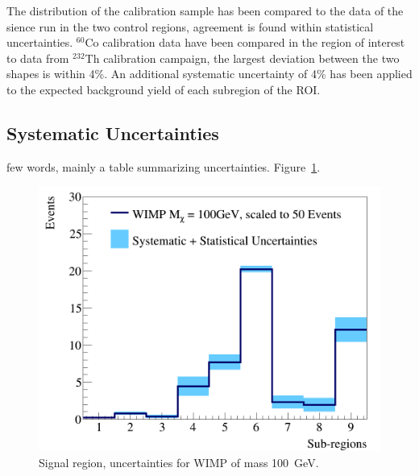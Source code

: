The distribution of the calibration sample has been compared to the data of the sience run in the two control regions,
agreement is found within statistical uncertainties. $^{60}$Co calibration data have been compared in the region of interest to  
data from $^{232}$Th calibration campaign, the largest deviation between the two shapes is within 4\%. An additional systematic
uncertainty of 4\% has been applied to the expected background yield of each subregion of the ROI.












\subsection{Systematic Uncertainties}

few words, mainly a table summarizing uncertainties. Figure~\ref{fig:unc}.

\begin{figure}[h]
  \includegraphics[width=\linewidth]{images/wimp_sys_unc.png}
  \caption{Signal region, uncertainties for WIMP of mass 100~GeV.}
  \label{fig:unc}
\end{figure}










